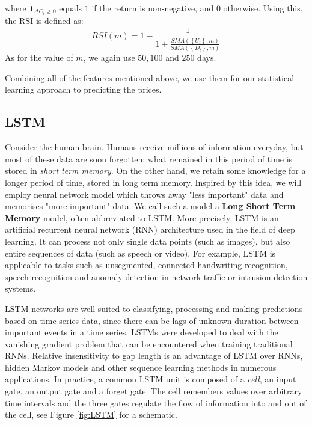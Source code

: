 \documentclass[twoside]{report}
\begin{document}
\begin{spacing}{1}
where $\mathbf{1}_{\Delta C_{t} \geq 0}$ equals $1$ if the return is non-negative, and $0$ otherwise. Using this, the RSI is defined as:
\[
R S I(m)=1-\frac{1}{1+\frac{S M A\left(\left\{U_{t}\right\}, m\right)}{S M A\left(\left\{D_{t}\right\}, m\right)}}
\]
As for the value of $m$, we again use $50, 100$ and $250$ days.

Combining all of the features mentioned above, we use them for our statistical learning approach to predicting the prices. 

\subsection{LSTM}

Consider the human brain. Humans receive millions of information everyday, but most of these data are soon forgotten; what remained in this period of time is stored in \textit{short term memory}. On the other hand, we retain some knowledge for a longer period of time, stored in long term memory. Inspired by this idea, we will employ neural network model which throws away "less important" data and memorises "more important" data. We call such a model a \textbf{Long Short Term Memory} model, often abbreviated to LSTM.
More precisely, LSTM is an artificial recurrent neural network (RNN) architecture used in the field of deep learning. It can process not only single data points (such as images), but also entire sequences of data (such as speech or video). For example, LSTM is applicable to tasks such as unsegmented, connected handwriting recognition, speech recognition and anomaly detection in network traffic or intrusion detection systems.\cite{greff2016lstm}

LSTM networks are well-suited to classifying, processing and making predictions based on time series data, since there can be lags of unknown duration between important events in a time series. LSTMs were developed to deal with the vanishing gradient problem that can be encountered when training traditional RNNs. Relative insensitivity to gap length is an advantage of LSTM over RNNs, hidden Markov models and other sequence learning methods in numerous applications. In practice, a common LSTM unit is composed of a \textit{cell}, an input gate, an output gate and a forget gate. The cell remembers values over arbitrary time intervals and the three gates regulate the flow of information into and out of the cell, see Figure \ref{fig:LSTM} for a schematic.


\end{spacing}
\end{document}
